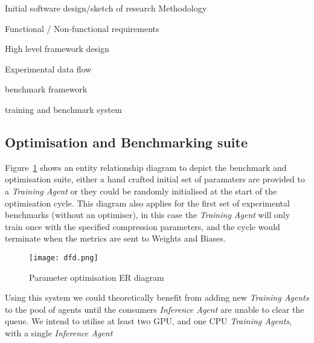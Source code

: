 \documentclass[../../D1.tex]{subfiles}
\begin{document}
Initial software design/sketch of research Methodology

Functional / Non-functional requirements

High level framework design



Experimental data flow

benchmark framework

training and benchmark system

\subsection{Optimisation and Benchmarking suite}\label{sec:ERdiagram}

Figure~\ref{fig:benchcycle} shows an entity relationship diagram to depict the benchmark and optimisation suite, either a hand crafted initial set of paramaters are provided to a \emph{Training Agent} or they could be randomly initialised at the start of the optimisation cycle.
This diagram also applies for the first set of experimental benchmarks (without an optimiser), in this case the \emph{Training Agent} will only train once with the specified compression parameters, and the cycle would terminate when the metrics are sent to Weights and Biases.

\begin{figure}[H]
    \texttt{[image: dfd.png]}
    \caption{Parameter optimisation ER diagram}
    \label{fig:benchcycle}
\end{figure}

Using this system we could theoretically benefit from adding new \emph{Training Agents} to the pool of agents until the consumers \emph{Inference Agent} are unable to clear the queue.
We intend to utilise at least two GPU, and one CPU \emph{Training Agents}, with a single \emph{Inference Agent}
\end{document}
